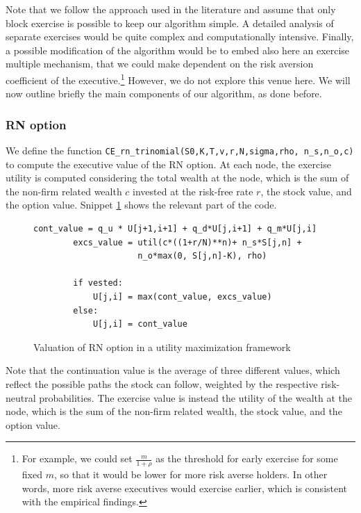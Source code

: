 Note that we follow the approach used in the literature and assume that only block exercise is possible to keep our algorithm simple. A detailed analysis of separate exercises would be quite complex and computationally intensive. 
Finally, a possible modification of the algorithm would be to embed also here an exercise multiple mechanism, that we could make dependent on the risk aversion coefficient of the executive.\footnote{For example, we could set $\frac{m}{1+\rho}$ as the threshold for early exercise for some fixed $m$, so that it would be lower for more risk averse holders. In other words, more risk averse executives would exercise earlier, which is consistent with the empirical findings.} However, we do not explore this venue here.
We will now outline briefly the main components of our algorithm, as done before.

\subsubsection{RN option}
We define the function \verb|CE_rn_trinomial(S0,K,T,v,r,N,sigma,rho, n_s,n_o,c)| to compute the executive value of the RN option. At each node, the exercise utility is computed considering the total wealth at the node, which is the sum of the non-firm related wealth $c$ invested at the risk-free rate $r$, the stock value, and the option value. Snippet \ref*{fig:ce_exec_rn} shows the relevant part of the code.
\newpage 

\vspace*{15pt}
\begin{figure}[H]
    \begin{lstlisting}[breaklines, basicstyle=\ttfamily\small]
        cont_value = q_u * U[j+1,i+1] + q_d*U[j,i+1] + q_m*U[j,i]
        excs_value = util(c*((1+r/N)**n)+ n_s*S[j,n] + 
                     n_o*max(0, S[j,n]-K), rho)
        
        if vested:
            U[j,i] = max(cont_value, excs_value)
        else: 
            U[j,i] = cont_value
    \end{lstlisting}
    \caption{Valuation of RN option in a utility maximization framework}
    \label{fig:ce_exec_rn}
\end{figure}
\vspace*{15pt}

Note that the continuation value is the average of three different values, which reflect the possible paths the stock can follow, weighted by the respective risk-neutral probabilities. The exercise value is instead the utility of the wealth at the node, which is the sum of the non-firm related wealth, the stock value, and the option value. 

